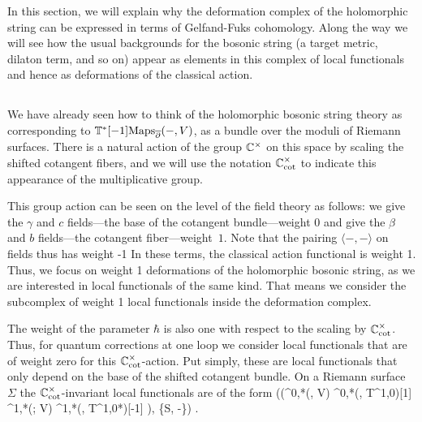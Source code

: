 In this section, we will explain why the deformation complex of the holomorphic string 
can be expressed in terms of Gelfand-Fuks cohomology. 
Along the way we will see how the usual backgrounds for the bosonic string (a target metric, dilaton term, and so on) appear as elements in this complex of local functionals and hence as deformations of the classical action. 

\subsection{}

We have already seen how to think of the holomorphic bosonic string theory 
as corresponding to $\mathbb T^*[-1]{\rm Maps}_{\overline{\partial}}(-, V)$, 
as a bundle over the moduli of Riemann surfaces. 
There is a natural action of the group $ \mathbb C^\times$ on this space
by scaling the shifted cotangent fibers,
and we will use the notation $\mathbb C^\times_{\rm cot}$ to indicate this appearance of the multiplicative group.

This group action can be seen on the level of the field theory as follows: 
we give the $\gamma$ and $c$ fields---the base of the cotangent bundle---weight $0$ and give the $\beta$ and $b$ fields---the cotangent fiber---weight~$1$. 
Note that the pairing $\langle-,-\rangle$ on fields thus has weight -1 
In these terms, the classical action functional is weight 1. 
Thus, we focus on weight 1 deformations of the holomorphic bosonic string,
as we are interested in local functionals of the same kind.
That means we consider the subcomplex of weight 1 local functionals inside the deformation complex.

The weight of the parameter $\hbar$ is also one with respect to the scaling by $\mathbb C^\times_{\rm cot}$.
Thus, for quantum corrections at one loop we consider local functionals that are of weight zero for this $\mathbb C^\times_{\rm cot}$-action.
Put simply, these are local functionals that only depend on the base of the shifted cotangent bundle. 
On a Riemann surface $\Sigma$ the $\mathbb C^\times_{\rm cot}$-invariant local functionals are of the form
\ben
\left(\Oloc\left(\Omega^{0,*}(\Sigma, V) \oplus \Omega^{0,*}(\Sigma, T^{1,0})[1] \Omega^{1,*}(\Sigma ; V) \oplus \Omega^{1,*}(\Sigma, T^{1,0*})[-1] \right), \{S, -\}\right) .
\een

